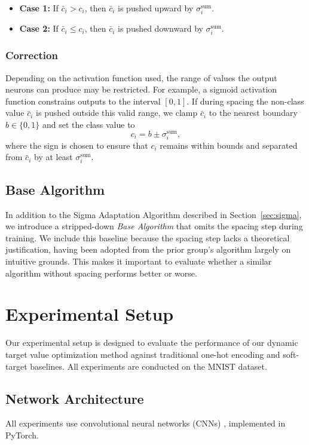 \documentclass[12pt,fleqn,a4paper]{article}
\begin{document}
\begin{itemize}
    \item \textbf{Case 1:} If $\bar{c}_i > c_i$, then $\bar{c}_i$ is pushed upward by $\sigma^{\text{sum}}_i$.
    \item \textbf{Case 2:} If $\bar{c}_i \leq c_i$, then $\bar{c}_i$ is pushed downward by $\sigma^{\text{sum}}_i$.
\end{itemize}

\subsubsection{Correction}\label{sec:correct}
Depending on the activation function used, the range of values the output neurons can produce may be restricted. For example, a sigmoid activation function constrains outputs to the interval $[0,1]$. If during spacing the non-class value $\bar{c}_i$ is pushed outside this valid range, we clamp $\bar{c}_i$ to the nearest boundary $b \in \{0,1\}$ and set the class value to
\[
c_i = b \pm \sigma^{\text{sum}}_i,
\]
where the sign is chosen to ensure that $c_i$ remains within bounds and separated from $\bar{c}_i$ by at least $\sigma^{\text{sum}}_i$.

\subsection{Base Algorithm}\label{sec:base}
In addition to the Sigma Adaptation Algorithm described in Section~\ref{sec:sigma}, we introduce a stripped-down \textit{Base Algorithm} that omits the spacing step during training. We include this baseline because the spacing step lacks a theoretical justification, having been adopted from the prior group's algorithm largely on intuitive grounds. This makes it important to evaluate whether a similar algorithm without spacing performs better or worse.

\section{Experimental Setup}
 Our experimental setup is designed to evaluate the performance of our dynamic target value optimization method against traditional one-hot encoding and soft-target baselines. All experiments are conducted on the MNIST dataset.

 \subsection{Network Architecture}\label{sec:net_arch}
All experiments use convolutional neural  networks (CNNs) , implemented in PyTorch.
\end{document}
